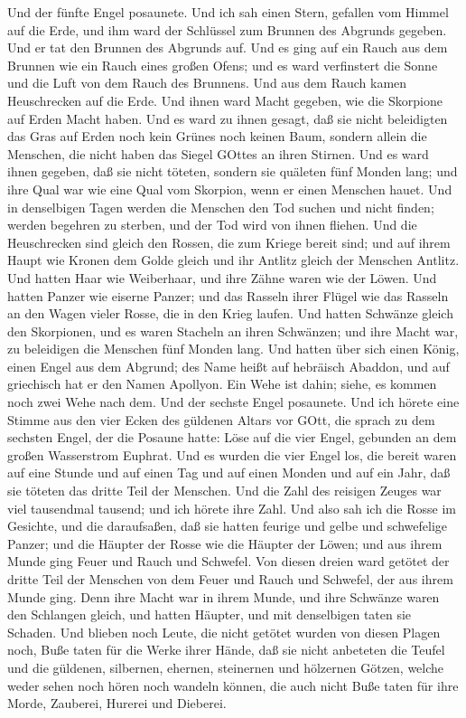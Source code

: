  Und der fünfte Engel posaunete. Und ich sah einen Stern,
gefallen vom Himmel auf die Erde, und ihm ward der Schlüssel zum Brunnen
des Abgrunds gegeben.  Und er tat den Brunnen des Abgrunds
auf. Und es ging auf ein Rauch aus dem Brunnen wie ein Rauch eines
großen Ofens; und es ward verfinstert die Sonne und die Luft von dem
Rauch des Brunnens.  Und aus dem Rauch kamen Heuschrecken
auf die Erde. Und ihnen ward Macht gegeben, wie die Skorpione auf Erden
Macht haben.  Und es ward zu ihnen gesagt, daß sie nicht
beleidigten das Gras auf Erden noch kein Grünes noch keinen Baum,
sondern allein die Menschen, die nicht haben das Siegel GOttes an ihren
Stirnen.  Und es ward ihnen gegeben, daß sie nicht töteten,
sondern sie quäleten fünf Monden lang; und ihre Qual war wie eine Qual
vom Skorpion, wenn er einen Menschen hauet.  Und in
denselbigen Tagen werden die Menschen den Tod suchen und nicht finden;
werden begehren zu sterben, und der Tod wird von ihnen fliehen.
 Und die Heuschrecken sind gleich den Rossen, die zum Kriege
bereit sind; und auf ihrem Haupt wie Kronen dem Golde gleich und ihr
Antlitz gleich der Menschen Antlitz.  Und hatten Haar wie
Weiberhaar, und ihre Zähne waren wie der Löwen.  Und hatten
Panzer wie eiserne Panzer; und das Rasseln ihrer Flügel wie das Rasseln
an den Wagen vieler Rosse, die in den Krieg laufen.  Und
hatten Schwänze gleich den Skorpionen, und es waren Stacheln an ihren
Schwänzen; und ihre Macht war, zu beleidigen die Menschen fünf Monden
lang.  Und hatten über sich einen König, einen Engel aus
dem Abgrund; des Name heißt auf hebräisch Abaddon, und auf griechisch
hat er den Namen Apollyon.  Ein Wehe ist dahin; siehe, es
kommen noch zwei Wehe nach dem.  Und der sechste Engel
posaunete. Und ich hörete eine Stimme aus den vier Ecken des güldenen
Altars vor GOtt,  die sprach zu dem sechsten Engel, der die
Posaune hatte: Löse auf die vier Engel, gebunden an dem großen
Wasserstrom Euphrat.  Und es wurden die vier Engel los, die
bereit waren auf eine Stunde und auf einen Tag und auf einen Monden und
auf ein Jahr, daß sie töteten das dritte Teil der Menschen.
 Und die Zahl des reisigen Zeuges war viel tausendmal
tausend; und ich hörete ihre Zahl.  Und also sah ich die
Rosse im Gesichte, und die daraufsaßen, daß sie hatten feurige und gelbe
und schwefelige Panzer; und die Häupter der Rosse wie die Häupter der
Löwen; und aus ihrem Munde ging Feuer und Rauch und Schwefel.
 Von diesen dreien ward getötet der dritte Teil der
Menschen von dem Feuer und Rauch und Schwefel, der aus ihrem Munde ging.
 Denn ihre Macht war in ihrem Munde, und ihre Schwänze
waren den Schlangen gleich, und hatten Häupter, und mit denselbigen
taten sie Schaden.  Und blieben noch Leute, die nicht
getötet wurden von diesen Plagen noch, Buße taten für die Werke ihrer
Hände, daß sie nicht anbeteten die Teufel und die güldenen, silbernen,
ehernen, steinernen und hölzernen Götzen, welche weder sehen noch hören
noch wandeln können,  die auch nicht Buße taten für ihre
Morde, Zauberei, Hurerei und Dieberei.

